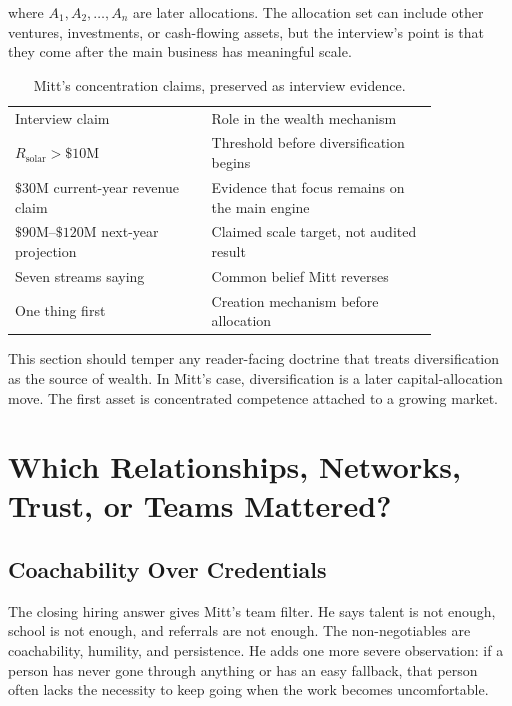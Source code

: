 \documentclass[11pt,oneside]{book}
\begin{document}
where \(A_1,A_2,\ldots,A_n\) are later allocations. The allocation set can include other ventures, investments, or cash-flowing assets, but the interview's point is that they come after the main business has meaningful scale.

\begin{table}
\centering
\begin{tabular}{p{0.39\linewidth}p{0.45\linewidth}}
Interview claim & Role in the wealth mechanism \\
\(R_{\mathrm{solar}}>\$10\mathrm{M}\) & Threshold before diversification begins \\
\(\$30\mathrm{M}\) current-year revenue claim & Evidence that focus remains on the main engine \\
\(\$90\mathrm{M}\text{--}\$120\mathrm{M}\) next-year projection & Claimed scale target, not audited result \\
Seven streams saying & Common belief Mitt reverses \\
One thing first & Creation mechanism before allocation \\
\end{tabular}
\caption{Mitt's concentration claims, preserved as interview evidence.}
\end{table}

This section should temper any reader-facing doctrine that treats diversification as the source of wealth. In Mitt's case, diversification is a later capital-allocation move. The first asset is concentrated competence attached to a growing market.

\chapter{Which Relationships, Networks, Trust, or Teams Mattered?}

\section{Coachability Over Credentials}

The closing hiring answer gives Mitt's team filter. He says talent is not enough, school is not enough, and referrals are not enough. The non-negotiables are coachability, humility, and persistence. He adds one more severe observation: if a person has never gone through anything or has an easy fallback, that person often lacks the necessity to keep going when the work becomes uncomfortable.
\end{document}
